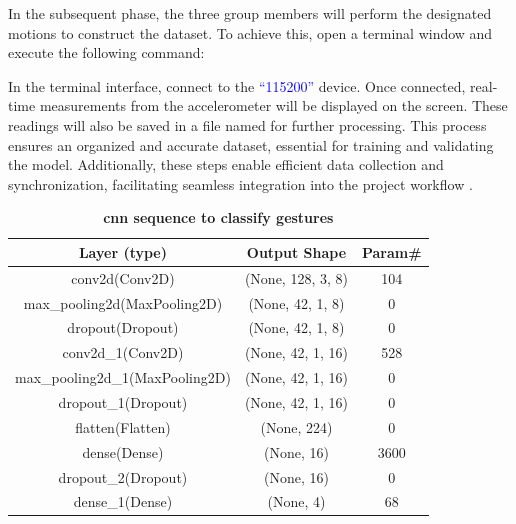In the subsequent phase, the three group members will perform the designated motions to construct the dataset. To achieve this, open a terminal window and execute the following command:


In the terminal interface, connect to the \textcolor{blue}{``115200''} device. Once connected, real-time measurements from the accelerometer will be displayed on the screen. These readings will also be saved in a file named  for further processing. This process ensures an organized and accurate dataset, essential for training and validating the model. Additionally, these steps enable efficient data collection and synchronization, facilitating seamless integration into the project workflow \cite{Warden:2020}.

%
%
\begin{table}
	\caption{\textbf{\ac{cnn} sequence to classify gestures }}
	\label{Table 7.1}
	\begin{center}
		\begin{tabular}{||c c c||} 
			\hline
			Layer (type) & Output Shape & Param\# \\ [0.5ex] 
			\hline\hline
			conv2d(Conv2D) & (None, 128, 3, 8) & 104 \\ 
			\hline
			max\_pooling2d(MaxPooling2D) & (None, 42, 1, 8) & 0 \\
			\hline
			dropout(Dropout) & (None, 42, 1, 8) & 0  \\
			\hline
			conv2d\_1(Conv2D) & (None, 42, 1, 16) & 528 \\
			\hline
			max\_pooling2d\_1(MaxPooling2D) & (None, 42, 1, 16) & 0 \\  
			\hline
			dropout\_1(Dropout) & (None, 42, 1, 16) & 0  \\
			\hline
			flatten(Flatten) & (None, 224) & 0  \\
			\hline
			dense(Dense) & (None, 16) & 3600  \\  
			\hline
			dropout\_2(Dropout) & (None, 16) & 0  \\
			\hline
			dense\_1(Dense) & (None, 4) & 68  \\ [1ex] 
			\hline
		\end{tabular}
	\end{center}
\end{table}	

